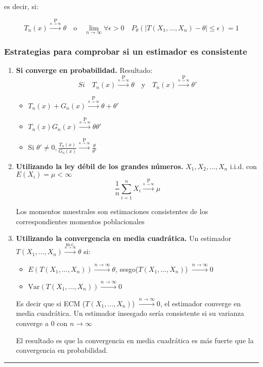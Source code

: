es decir, si:

\[
    T_n(x) \xrightarrow{\underset{n \to \infty}{\text{P}}} \theta \quad \text{o} \quad \lim_{n \to \infty} \forall \epsilon > 0 \quad P_\theta\left(|T(X_1, \dots, X_n) - \theta| \leq \epsilon\right) = 1
\]

\newpage
\subsubsection*{Estrategias para comprobar si un estimador es consistente}

\begin{enumerate}
    \setlength{\parskip}{1em}
    \item \textbf{Si converge en probabilidad.}
          Resultado:
          \[
              Si \quad T_n(x) \xrightarrow{\underset{n \to \infty}{\text{P}}} \theta \quad \text{y} \quad T_n(x) \xrightarrow{\underset{n \to \infty}{\text{P}}} \theta'
          \]
          \begin{itemize}
              \item $T_n(x)+G_n(x) \xrightarrow{\underset{n \to \infty}{\text{P}}} \theta + \theta '$
              \item $T_n(x)G_n(x) \xrightarrow{\underset{n \to \infty}{\text{P}}} \theta\theta '$
              \item Si $\theta' \neq 0, \frac{T_n(x)}{G_n(x)} \xrightarrow{\underset{n \to \infty}{\text{P}}} \frac{\theta}{\theta '}$
          \end{itemize}

    \item \textbf{Utilizando la ley débil de los grandes números.}
          $X_1, X_2, \dots, X_n$ i.i.d. con $E(X_i)=\mu < \infty$
          \setlength{\parskip}{0em}
          \[\frac{1}{n}\sum_{i=1}^{n} X_i \xrightarrow{\underset{n \to \infty}{\text{P}}} \mu\]

          \setlength{\parskip}{1em}
          Los momentos muestrales son estimaciones consistentes de los correspondientes momentos poblacionales

    \item \textbf{Utilizando la convergencia en media cuadrática.}
          Un estimador $T(X_1, \dots, X_n)\xrightarrow{\underset{n \to \infty}{\text{m.c.}}} \theta$ si:
          \begin{itemize}
              \item $E(T(X_1, \dots, X_n)) \xrightarrow{{n \to \infty}} \theta$, sesgo($T(X_1, \dots, X_n)$) $\xrightarrow{{n \to \infty}} 0$
              \item $\text{Var}(T(X_1, \dots, X_n)) \xrightarrow{{n \to \infty}} 0$
          \end{itemize}
          Es decir que si ECM ($T(X_1, \dots, X_n)$) $\xrightarrow{{n \to \infty}} 0$, el estimador converge en media cuadrática. Un estimador insesgado sería consistente si su varianza converge a 0 con $n \to \infty$

          El resultado es que la convergencia en media cuadrática es más fuerte que la convergencia en probabilidad.
\end{enumerate}
\noindent\rule{\textwidth}{0.2pt} %

